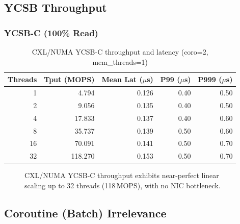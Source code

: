 \documentclass[conference]{IEEEtran}
\begin{document}
\subsection{YCSB Throughput}

\subsubsection{YCSB-C (100\% Read)}

\begin{table}[H]
\centering
\caption{CXL/NUMA YCSB-C throughput and latency (coro=2, mem\_threads=1)}
\label{tab:numa-ycsbc}
\begin{tabular}{@{}rrrrr@{}}
\toprule
\textbf{Threads} & \textbf{Tput (MOPS)} & \textbf{Mean Lat ($\mu$s)} & \textbf{P99 ($\mu$s)} & \textbf{P999 ($\mu$s)} \\
\midrule
1  & 4.794  & 0.126 & 0.40 & 0.50 \\
2  & 9.056  & 0.135 & 0.40 & 0.50 \\
4  & 17.833 & 0.137 & 0.40 & 0.60 \\
8  & 35.737 & 0.139 & 0.50 & 0.60 \\
16 & 70.091 & 0.141 & 0.50 & 0.70 \\
32 & 118.270 & 0.153 & 0.50 & 0.70 \\
\bottomrule
\end{tabular}
\end{table}

\begin{figure}[H]
\centering
{}
\caption{CXL/NUMA YCSB-C throughput exhibits near-perfect linear scaling up to 32 threads (118\,MOPS), with no NIC bottleneck.}
\label{fig:numa-ycsbc-bar}
\end{figure}

\subsection{Coroutine (Batch) Irrelevance}
\end{document}
